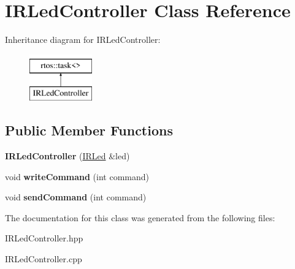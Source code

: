 \hypertarget{class_i_r_led_controller}{}\section{I\+R\+Led\+Controller Class Reference}
\label{class_i_r_led_controller}
Inheritance diagram for I\+R\+Led\+Controller\+:\begin{figure}[H]
\begin{center}
\leavevmode
\includegraphics[height=2.000000cm]{class_i_r_led_controller}
\end{center}
\end{figure}
\subsection*{Public Member Functions}
\begin{DoxyCompactItemize}
\item 
{\bfseries I\+R\+Led\+Controller} (\hyperlink{class_i_r_led}{I\+R\+Led} \&led)\hypertarget{class_i_r_led_controller_a4aad853ef866b522e3cf023d4b02b4c0}{}\label{class_i_r_led_controller_a4aad853ef866b522e3cf023d4b02b4c0}

\item 
void {\bfseries write\+Command} (int command)\hypertarget{class_i_r_led_controller_a42610b44fe281432ad6ebba2fb72f823}{}\label{class_i_r_led_controller_a42610b44fe281432ad6ebba2fb72f823}

\item 
void {\bfseries send\+Command} (int command)\hypertarget{class_i_r_led_controller_adeeff253be774a6a11d567110858624e}{}\label{class_i_r_led_controller_adeeff253be774a6a11d567110858624e}

\end{DoxyCompactItemize}


The documentation for this class was generated from the following files\+:\begin{DoxyCompactItemize}
\item 
I\+R\+Led\+Controller.\+hpp\item 
I\+R\+Led\+Controller.\+cpp\end{DoxyCompactItemize}
